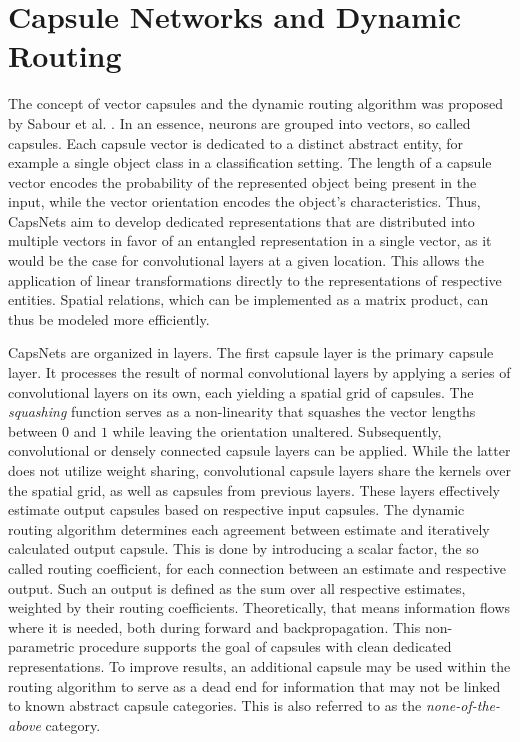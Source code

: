 \documentclass{article}
\begin{document}
\section{Capsule Networks and Dynamic Routing}
\label{lab:capsules}
The concept of vector capsules and the dynamic routing algorithm was proposed by Sabour et al. .
In an essence, neurons are grouped into vectors, so called capsules. Each capsule vector is dedicated to a distinct abstract entity, for example a single object class in a classification setting. The length of a capsule vector encodes the probability of the represented object being present in the input, while the vector orientation encodes the object's characteristics. Thus, CapsNets aim to develop dedicated representations that are distributed into multiple vectors in favor of an entangled representation in a single vector, as it would be the case for convolutional layers at a given location.
This allows the application of linear transformations directly to the representations of respective entities. Spatial relations, which can be implemented as a matrix product, can thus be modeled more efficiently.

CapsNets are organized in layers. The first capsule layer is the primary capsule layer. It processes the result of normal convolutional layers by applying a series of convolutional layers on its own, each yielding a spatial grid of capsules. The \textit{squashing} function serves as a non-linearity that squashes the vector lengths between $0$ and $1$ while leaving the orientation unaltered.
Subsequently, convolutional or densely connected capsule layers can be applied. While the latter does not utilize weight sharing, convolutional capsule layers share the kernels over the spatial grid, as well as capsules from previous layers. 
These layers effectively estimate output capsules based on respective input capsules. The dynamic routing algorithm determines each agreement between estimate and iteratively calculated output capsule. This is done by introducing a scalar factor, the so called routing coefficient, for each connection between an estimate and respective output. Such an output is defined as the sum over all respective estimates, weighted by their routing coefficients. Theoretically, that means information flows where it is needed, both during forward and backpropagation. This non-parametric procedure supports the goal of capsules with clean dedicated representations. To improve results, an additional capsule may be used within the routing algorithm to serve as a dead end for information that may not be linked to known abstract capsule categories. This is also referred to as the \emph{none-of-the-above} category.
\end{document}
